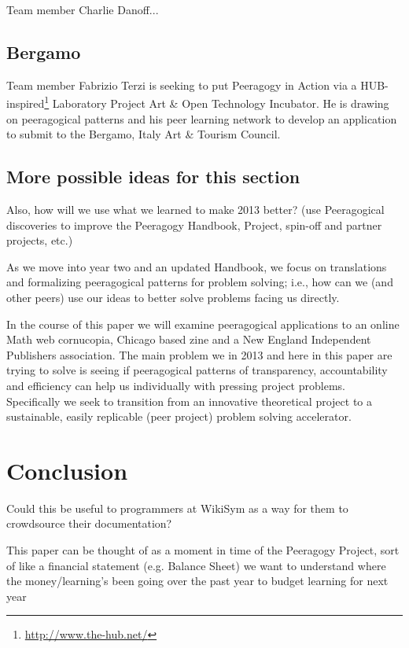 \documentclass{acm_proc_article-sp}
\begin{document}
Team member Charlie Danoff...

\subsection{Bergamo}

Team member Fabrizio Terzi is seeking to put Peeragogy in Action via a
HUB-inspired\footnote{\url{http://www.the-hub.net/}} Laboratory
Project Art \& Open Technology Incubator.  He is drawing on
peeragogical patterns and his peer learning network to develop an
application to submit to the Bergamo, Italy Art \& Tourism Council.

\subsection{More possible ideas for this section}

Also, how will we use what we learned to make 2013 better? (use
Peeragogical discoveries to improve the Peeragogy Handbook, Project,
spin-off and partner projects, etc.)

As we move into year two and an updated Handbook, we focus on translations and formalizing peeragogical patterns for problem solving; i.e., how can we (and other peers) use our ideas to better solve problems facing us directly.

In the course of this paper we will examine peeragogical applications to an online Math web cornucopia, Chicago based zine and a New England Independent Publishers association. The main problem we in 2013 and here in this paper are trying to solve is seeing if peeragogical patterns of transparency, accountability and efficiency can help us individually with pressing project problems. Specifically we seek to transition from an innovative theoretical project to a sustainable, easily replicable (peer project) problem solving accelerator.

%
%
%
%




\section{Conclusion}

Could this be useful to programmers at WikiSym as a way for them to
crowdsource their documentation?

This paper can be thought of as a moment in time of the Peeragogy Project, sort of like a financial statement (e.g. Balance Sheet) we want to understand where the money/learning's been going over the past year to budget learning for next year
\end{document}
